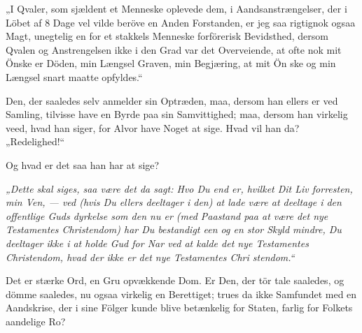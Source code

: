 \documentclass[12pt,a4paper]{article}
\newcommand{\opage}[1]{\marginnote{\footnotesize\textit{[#1]}}}
\begin{document}
„I Qvaler, som sjældent et Menneske oplevede dem,
i Aandsanstrængelser, der i Löbet af 8 Dage vel vilde
beröve en Anden Forstanden, er jeg saa rigtignok ogsaa
Magt, unegtelig en for et stakkels Menneske forförerisk
Bevidsthed, dersom Qvalen og Anstrengelsen ikke i den
Grad var det Overveiende, at ofte nok mit Önske er
\opage{2} %
Döden, min Længsel Graven, min Begjæring, at mit Ön\-%
ske og min Længsel snart maatte opfyldes.“

Den, der saaledes selv anmelder sin Optræden, maa,
dersom han ellers er ved Samling, tilvisse have en Byrde
paa sin Samvittighed; maa, dersom han virkelig veed,
hvad han siger, for Alvor have Noget at sige. Hvad
vil han da? „Redelighed!“

Og hvad er det saa han har at sige?

\emph{„Dette skal siges, saa være det da sagt:
Hvo Du end er, hvilket Dit Liv forresten, min
Ven, --- ved (hvis Du ellers deeltager i den) at
lade være at deeltage i den offentlige Guds\-%
dyrkelse som den nu er (med Paastand paa at
være det nye Testamentes Christendom) har Du
bestandigt een og en stor Skyld mindre, Du
deeltager ikke i at holde Gud for Nar ved
at kalde det nye Testamentes Christendom,
hvad der ikke er det nye Testamentes Chri\-%
stendom.“}

Det er stærke Ord, en Gru opvækkende Dom. Er
Den, der tör tale saaledes, og dömme saaledes, nu ogsaa
virkelig en Berettiget; trues da ikke Samfundet med en
Aandskrise, der i sine Fölger kunde blive betænkelig for
Staten, farlig for Folkets aandelige Ro?
\end{document}
